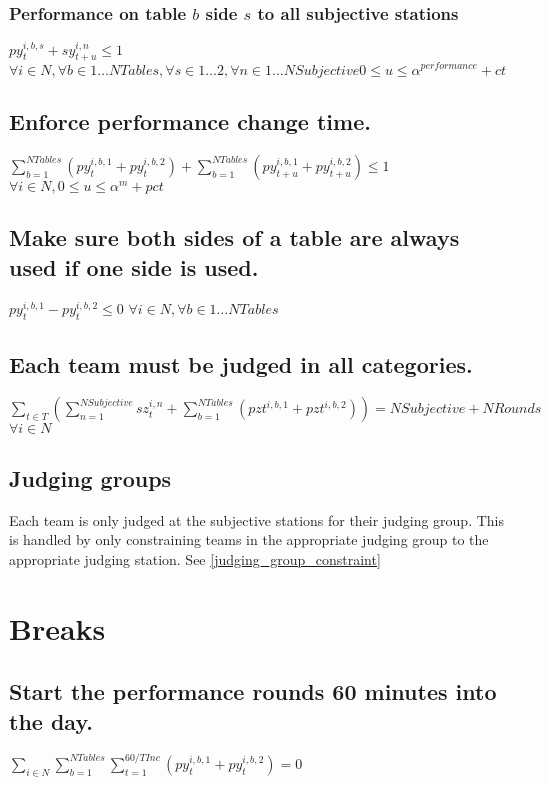\documentclass[letterpaper,11pt]{report}
\begin{document}
\subsubsection{Performance on table $b$ side $s$ to all subjective stations}
$py_{t}^{i,b,s} + sy_{t+u}^{i,n} \le 1$
\hfill $\forall i \in N,
\forall b \in 1 \dots NTables,
\forall s \in 1 \dots 2,
\forall n \in 1 \dots NSubjective
0 \le u \le \alpha^{performance}+ ct$


\subsection{Enforce performance change time.}
$
\sum\limits_{b=1}^{NTables} (py_{t}^{i,b,1} + py_{t}^{i,b,2})
+
\sum\limits_{b=1}^{NTables} (py_{t+u}^{i,b,1} + py_{t+u}^{i,b,2}) 
\le 1$
\hfill $\forall i \in N, 
0 \le u \le \alpha^{m} + pct$


\subsection{Make sure both sides of a table are always used if one side is
  used.}
$py_{t}^{i,b,1} - py_{t}^{i,b,2} \le 0$
\hfill $\forall i \in N,
\forall b \in 1 \dots NTables$


\subsection{Each team must be judged in all categories.}
$\sum\limits_{t \in T} ( 
    \sum\limits_{n=1}^{NSubjective} sz_{t}^{i,n}  
 + \sum\limits_{b=1}^{NTables} (pz{t}^{i,b,1} + pz{t}^{i,b,2})
)
= NSubjective + NRounds$
\hfill $\forall i \in N$


\subsection{Judging groups}
Each team is only judged at the subjective stations for their judging
group. This is handled by only constraining teams in the appropriate
judging group to the appropriate judging station. See \autoref{judging_group_constraint}


\section{Breaks}
\subsection{Start the performance rounds 60 minutes into the day.}
$\sum\limits_{i \in N} \sum\limits_{b=1}^{NTables} 
    \sum\limits_{t = 1}^{60/TInc} 
      ( py_{t}^{i,b,1} + py_{t}^{i,b,2} ) = 0$
\end{document}
